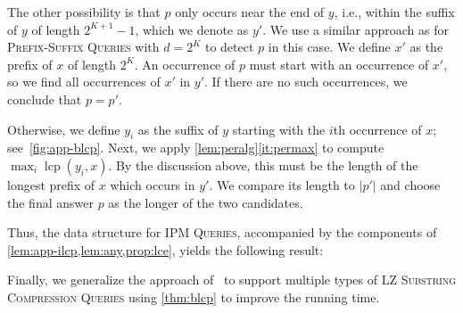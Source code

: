 \documentclass[a4paper]{article}
\theoremstyle{definition}
\theoremstyle{remark}
\newcommand{\IPM}{\textsc{IPM Queries}\xspace}
\newcommand{\BQ}{\textsc{Prefix-Suffix Queries}\xspace}
\newcommand{\LSC}{\textsc{LZ Substring Compression Queries}\xspace}
\newcommand{\lcp}{\operatorname{lcp}}
\begin{document}
The other possibility is that $p$ only occurs near the end of $y$, i.e., within the suffix of $y$ of length $2^{K+1}-1$, which we denote as $y'$.
We use a similar approach as for \BQ with $d=2^K$ to detect $p$ in this case.
We define $x'$ as the prefix of $x$ of length $2^K$.
An occurrence of $p$ must start with an occurrence of $x'$, so we find all occurrences of $x'$ in $y'$.
If there are no such occurrences, we conclude that $p=p'$.

Otherwise, we define $y_i$ as the suffix of $y$ starting with the $i$th occurrence of $x$; see~\cref{fig:app-blcp}.
Next, we apply \cref{lem:peralg}\ref{it:permax} to compute $\max_i \lcp(y_i,x)$. By the discussion above,
this must be the length of the longest prefix of $x$ which occurs in $y'$.
We compare its length to $|p'|$ and choose the final answer $p$ as the longer of the two candidates.

Thus, the data structure for \IPM, accompanied by the components of \cref{lem:app-ilcp,lem:any,prop:lce},
yields the following result:

\thmblcp*

Finally, we generalize the approach of~\cite{DBLP:journals/tcs/KellerKFL14} to support multiple types of \LSC using \cref{thm:blcp} to improve the running time.
\end{document}
